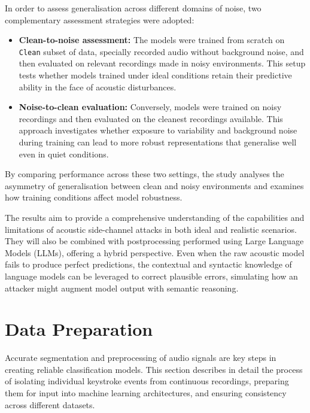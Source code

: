 \documentclass[a4paper,11pt,twoside]{report}
\theoremstyle{definition}
\begin{document}
In order to assess generalisation across different domains of noise, two complementary assessment strategies were adopted:

\begin{itemize}
    \item \textbf{Clean-to-noise assessment:} The models were trained from scratch on \texttt{Clean} subset of data, specially recorded audio without background noise, and then evaluated on relevant recordings made in noisy environments. This setup tests whether models trained under ideal conditions retain their predictive ability in the face of acoustic disturbances.

    \item \textbf{Noise-to-clean evaluation:} Conversely, models were trained on noisy recordings and then evaluated on the cleanest recordings available. This approach investigates whether exposure to variability and background noise during training can lead to more robust representations that generalise well even in quiet conditions.
\end{itemize}

By comparing performance across these two settings, the study analyses the asymmetry of generalisation between clean and noisy environments and examines how training conditions affect model robustness.

\vspace{0.7cm}

The results aim to provide a comprehensive understanding of the capabilities and limitations of acoustic side-channel attacks in both ideal and realistic scenarios. They will also be combined with postprocessing performed using Large Language Models (LLMs), offering a hybrid perspective. Even when the raw acoustic model fails to produce perfect predictions, the contextual and syntactic knowledge of language models can be leveraged to correct plausible errors, simulating how an attacker might augment model output with semantic reasoning.

\section{Data Preparation}

Accurate segmentation and preprocessing of audio signals are key steps in creating reliable classification models. This section describes in detail the process of isolating individual keystroke events from continuous recordings, preparing them for input into machine learning architectures, and ensuring consistency across different datasets.
\end{document}
